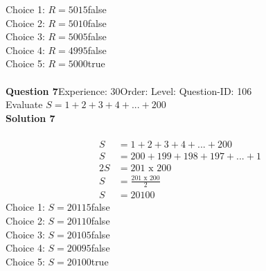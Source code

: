\documentclass{article}
\begin{document}
Choice 1: \hspace{20pt}$R=5015$\hspace{20pt}false\\
Choice 2: \hspace{20pt}$R=5010$\hspace{20pt}false\\
Choice 3: \hspace{20pt}$R=5005$\hspace{20pt}false\\
Choice 4: \hspace{20pt}$R=4995$\hspace{20pt}false\\
Choice 5: \hspace{20pt}$R=5000$\hspace{20pt}true\\
\\[4pt]
\noindent\textbf{Question 7}\hspace{20pt}Experience: 30\hspace{20pt}Order: \hspace{20pt}Level: \hspace{20pt}Question-ID: 106\\[2pt]
Evaluate $S=1+2+3+4+...+200$\\[4pt]
\noindent\textbf{Solution 7}\\[2pt]
\\[-35pt]\begin{align*}
S&=1+2+3+4+...+200\\[2pt]
S&=200+199+198+197+...+1\\[2pt]
2S&=201\,\,\text{x}\,\,200\\[2pt]
S&=\displaystyle\frac{201\,\,\text{x}\,\,200}{2}\\[2pt]
S&=20100
\end{align*}
Choice 1: \hspace{20pt}$S=20115$\hspace{20pt}false\\
Choice 2: \hspace{20pt}$S=20110$\hspace{20pt}false\\
Choice 3: \hspace{20pt}$S=20105$\hspace{20pt}false\\
Choice 4: \hspace{20pt}$S=20095$\hspace{20pt}false\\
Choice 5: \hspace{20pt}$S=20100$\hspace{20pt}true\\
\end{document}
